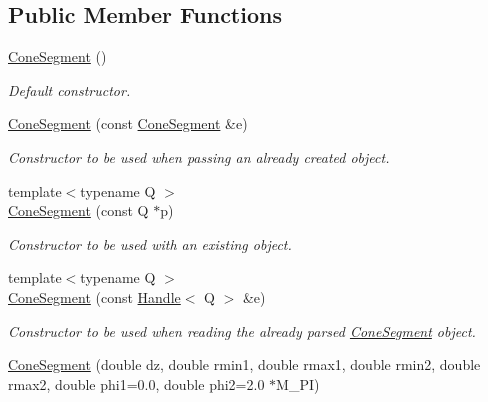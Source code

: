 \subsection*{Public Member Functions}
\begin{DoxyCompactItemize}
\item 
\hyperlink{class_d_d4hep_1_1_geometry_1_1_cone_segment_a066f3dc238069de0c9bd9d914218229a}{ConeSegment} ()
\begin{DoxyCompactList}\small\item\em Default constructor. \item\end{DoxyCompactList}\item 
\hyperlink{class_d_d4hep_1_1_geometry_1_1_cone_segment_a4b394ee203efc33e4ae6fa85bee189c3}{ConeSegment} (const \hyperlink{class_d_d4hep_1_1_geometry_1_1_cone_segment}{ConeSegment} \&e)
\begin{DoxyCompactList}\small\item\em Constructor to be used when passing an already created object. \item\end{DoxyCompactList}\item 
{\footnotesize template$<$typename Q $>$ }\\\hyperlink{class_d_d4hep_1_1_geometry_1_1_cone_segment_a423c53f5a59d8873e4c60a99df0834e7}{ConeSegment} (const Q $\ast$p)
\begin{DoxyCompactList}\small\item\em Constructor to be used with an existing object. \item\end{DoxyCompactList}\item 
{\footnotesize template$<$typename Q $>$ }\\\hyperlink{class_d_d4hep_1_1_geometry_1_1_cone_segment_a49916c0fcebe19754bde6cfc2df4e5d5}{ConeSegment} (const \hyperlink{class_d_d4hep_1_1_handle}{Handle}$<$ Q $>$ \&e)
\begin{DoxyCompactList}\small\item\em Constructor to be used when reading the already parsed \hyperlink{class_d_d4hep_1_1_geometry_1_1_cone_segment}{ConeSegment} object. \item\end{DoxyCompactList}\item 
\hyperlink{class_d_d4hep_1_1_geometry_1_1_cone_segment_a678511761af3275a6f07099fd0b7854f}{ConeSegment} (double dz, double rmin1, double rmax1, double rmin2, double rmax2, double phi1=0.0, double phi2=2.0 $\ast$M\_\-PI)

\end{DoxyCompactItemize}
